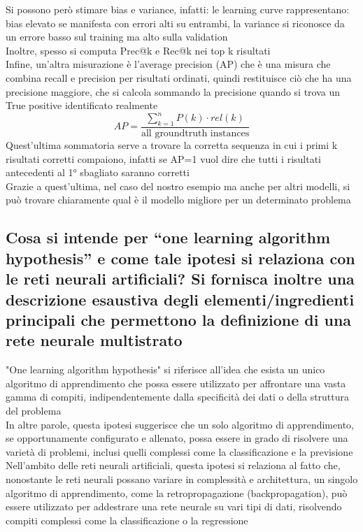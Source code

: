 \documentclass[10pt,oneside,a4paper]{article}
\begin{document}
	Si possono però stimare bias e variance, infatti:
	le learning curve rappresentano:\\
	bias elevato se manifesta con errori alti su entrambi, la variance si riconosce da un errore basso sul training ma alto sulla validation\\
	Inoltre, spesso si computa Prec@k e Rec@k nei top k risultati\\
	Infine, un'altra misurazione è l'average precision (AP) che è una misura che combina recall e precision per risultati ordinati, quindi restituisce ciò che ha una precisione maggiore, che si calcola sommando la precisione quando si trova un True positive identificato realmente
	\[ AP=\frac{\sum_{k=1}^{n}P(k) \cdot rel(k)}{\text{all groundtruth instances}} \]
	Quest'ultima sommatoria serve a trovare la corretta sequenza in cui i primi k risultati corretti compaiono, infatti se AP=1 vuol dire che tutti i risultati antecedenti al 1° sbagliato saranno corretti\\
	Grazie a quest'ultima, nel caso del nostro esempio ma anche per altri modelli, si può trovare chiaramente qual è il modello migliore per un determinato problema
	
	
	
	
	\subsection{Cosa si intende per “one learning algorithm hypothesis” e come tale ipotesi si relaziona
		con le reti neurali artificiali? Si fornisca inoltre una descrizione esaustiva degli elementi/ingredienti
		principali che permettono la definizione di una rete neurale multistrato}
	"One learning algorithm hypothesis" si riferisce all'idea che esista un unico algoritmo di apprendimento che possa essere utilizzato per affrontare una vasta gamma di compiti, indipendentemente dalla specificità dei dati o della struttura del problema\\
	In altre parole, questa ipotesi suggerisce che un solo algoritmo di apprendimento, se opportunamente configurato e allenato, possa essere in grado di risolvere una varietà di problemi, inclusi quelli complessi come la classificazione e la previsione\\
	Nell'ambito delle reti neurali artificiali, questa ipotesi si relaziona al fatto che, nonostante le reti neurali possano variare in complessità e architettura, un singolo algoritmo di apprendimento, come la retropropagazione (backpropagation), può essere utilizzato per addestrare una rete neurale su vari tipi di dati, risolvendo compiti complessi come la classificazione o la regressione
	
\end{document}
